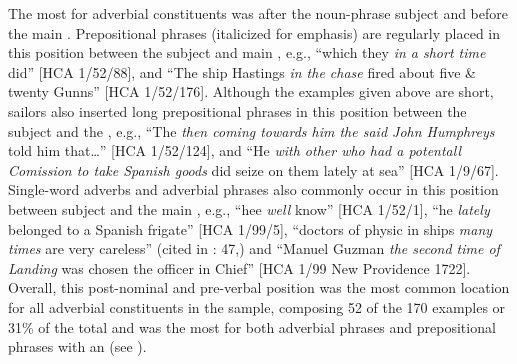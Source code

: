 {\color{red}
The most  for adverbial constituents was after the noun-phrase subject and before the main . Prepositional phrases (italicized for emphasis) are regularly placed in this position between the subject and main , e.g., “which they \textit{in a short time} did” [HCA 1/52/88], and “The ship Hastings \textit{in the chase} fired about five \& twenty Gunns” [HCA 1/52/176]. Although the examples given above are short, sailors also inserted long prepositional phrases in this position between the subject and the , e.g., “The  \textit{then coming towards him the said John Humphreys} told him that…” [HCA 1/52/124], and “He \textit{with other who had a potentall Comission to take Spanish goods} did seize on them lately at sea” [HCA 1/9/67]. Single-word adverbs and adverbial phrases also commonly occur in this position between subject and the main , e.g., “hee \textit{well} know” [HCA 1/52/1], “he \textit{lately} belonged to a Spanish frigate” [HCA 1/99/5], “doctors of physic in ships \textit{many times} are very careless” (cited in \citealt{Brown2011}: 47,) and “Manuel Guzman \textit{the second time of Landing} was chosen the officer in Chief” [HCA 1/99 New Providence 1722]. Overall, this post-nominal and pre-verbal position was the most common location for all adverbial constituents in the sample, composing 52 of the 170 examples or 31\% of the total and was the most  for both adverbial phrases and prepositional phrases with an  
(see ). 


}
